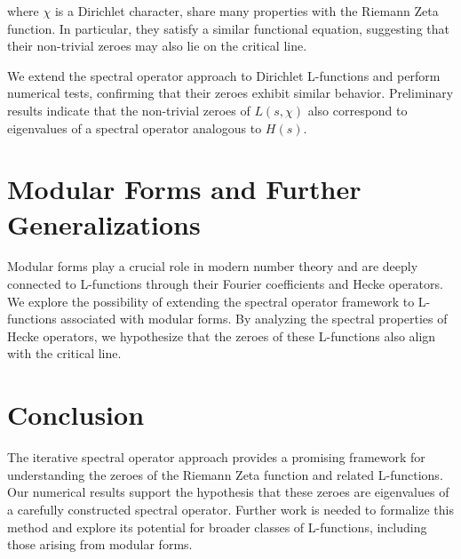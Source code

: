 \documentclass{article}
\begin{document}
where $\chi$ is a Dirichlet character, share many properties with the Riemann Zeta function. In particular, they satisfy a similar functional equation, suggesting that their non-trivial zeroes may also lie on the critical line.

We extend the spectral operator approach to Dirichlet L-functions and perform numerical tests, confirming that their zeroes exhibit similar behavior. Preliminary results indicate that the non-trivial zeroes of $L(s, \chi)$ also correspond to eigenvalues of a spectral operator analogous to $H(s)$.

\section{Modular Forms and Further Generalizations}

Modular forms play a crucial role in modern number theory and are deeply connected to L-functions through their Fourier coefficients and Hecke operators. We explore the possibility of extending the spectral operator framework to L-functions associated with modular forms. By analyzing the spectral properties of Hecke operators, we hypothesize that the zeroes of these L-functions also align with the critical line.

\section{Conclusion}

The iterative spectral operator approach provides a promising framework for understanding the zeroes of the Riemann Zeta function and related L-functions. Our numerical results support the hypothesis that these zeroes are eigenvalues of a carefully constructed spectral operator. Further work is needed to formalize this method and explore its potential for broader classes of L-functions, including those arising from modular forms.
\end{document}
